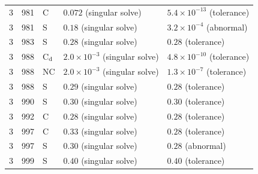 \begin{tabular}{@{}rrl ll@{}}
3 & 981 & C & $0.072$ (singular solve) & $5.4\times10^{-13}$ (tolerance)\\
3 & 981 & S & $0.18$ (singular solve) & $3.2\times10^{-4}$ (abnormal)\\
3 & 983 & S & $0.28$ (singular solve) & $0.28$ (tolerance)\\
3 & 988 & C$_{\rm d}$ & $2.0\times10^{-3}$ (singular solve) & $4.8\times10^{-10}$ (tolerance)\\
3 & 988 & NC & $2.0\times10^{-3}$ (singular solve) & $1.3\times10^{-7}$ (tolerance)\\
3 & 988 & S & $0.29$ (singular solve) & $0.28$ (tolerance)\\
3 & 990 & S & $0.30$ (singular solve) & $0.30$ (tolerance)\\
3 & 992 & C & $0.28$ (singular solve) & $0.28$ (tolerance)\\
3 & 997 & C & $0.33$ (singular solve) & $0.28$ (tolerance)\\
3 & 997 & S & $0.30$ (singular solve) & $0.28$ (abnormal)\\
3 & 999 & S & $0.40$ (singular solve) & $0.40$ (tolerance)\\
\bottomrule
\end{tabular}
